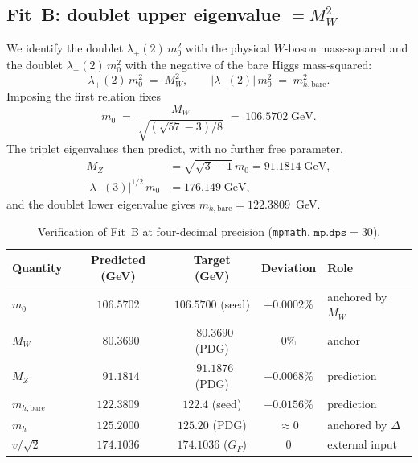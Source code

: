 \documentclass[%
 aps,
 prd,
 reprint,
 nofootinbib,
 superscriptaddress,
 amsmath,
 amssymb,
]{revtex4-2}
\begin{document}
\subsection{Fit~B: doublet upper eigenvalue $=M_W^2$}\label{sec:fitB}

We identify the doublet $\lambda_+(2)\,m_0^2$ with the physical $W$-boson mass-squared and the doublet $\lambda_-(2)\,m_0^2$ with the negative of the bare Higgs mass-squared:
\begin{equation}\label{eq:fitB}
\lambda_+(2)\,m_0^2 \;=\; M_W^2,\qquad |\lambda_-(2)|\,m_0^2 \;=\; m_{h,\mathrm{bare}}^2.
\end{equation}
Imposing the first relation fixes
\begin{equation}\label{eq:m0}
m_0 \;=\; \frac{M_W}{\sqrt{(\sqrt{57}-3)/8}} \;=\; 106.5702\;\mathrm{GeV}.
\end{equation}
The triplet eigenvalues then predict, with no further free parameter,
\begin{equation}\label{eq:MZ}
\begin{aligned}
M_Z &= \sqrt{\sqrt{3}-1}\,m_0 = 91.1814\;\mathrm{GeV},\\
|\lambda_-(3)|^{1/2}\,m_0 &= 176.149\;\mathrm{GeV},
\end{aligned}
\end{equation}
and the doublet lower eigenvalue gives $m_{h,\mathrm{bare}}=122.3809$~GeV.

\begin{table}[t]
\caption{Verification of Fit~B at four-decimal precision (\texttt{mpmath}, $\texttt{mp.dps}=30$).}
\label{tab:fit}
\begin{ruledtabular}
\begin{tabular}{lcccl}
Quantity & Predicted (GeV) & Target (GeV) & Deviation & Role \\
\hline
$m_0$           & $106.5702$ & $106.5700$ (seed) & $+0.0002\%$ & anchored by $M_W$ \\
$M_W$           & $\phantom{0}80.3690$ & $\phantom{0}80.3690$ (PDG) & $0\%$ & anchor \\
$M_Z$           & $\phantom{0}91.1814$ & $\phantom{0}91.1876$ (PDG) & $-0.0068\%$ & prediction \\
$m_{h,\mathrm{bare}}$ & $122.3809$ & $122.4$ (seed) & $-0.0156\%$ & prediction \\
$m_h$           & $125.2000$ & $125.20$ (PDG) & $\approx 0$ & anchored by $\Delta$ \\
$v/\sqrt{2}$    & $174.1036$ & $174.1036$ ($G_F$) & $0$ & external input \\
\end{tabular}
\end{ruledtabular}
\end{table}
\end{document}

